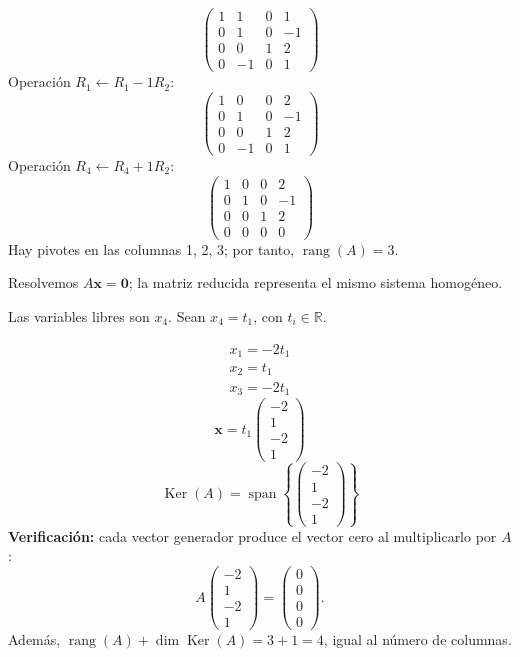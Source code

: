 \documentclass[12pt]{article}
\theoremstyle{remark}
\newcommand{\rang}{\operatorname{rang}}
\newcommand{\Ker}{\operatorname{Ker}}
\newcommand{\vect}[1]{\boldsymbol{#1}}
\begin{document}
\[
\begin{pmatrix}1&1&0&1\\0&1&0&-1\\0&0&1&2\\0&-1&0&1\end{pmatrix}
\]
Operación $R_{1}\leftarrow R_{1}-1R_{2}$:
\[
\begin{pmatrix}1&0&0&2\\0&1&0&-1\\0&0&1&2\\0&-1&0&1\end{pmatrix}
\]
Operación $R_{4}\leftarrow R_{4}+1R_{2}$:
\[
\begin{pmatrix}1&0&0&2\\0&1&0&-1\\0&0&1&2\\0&0&0&0\end{pmatrix}
\]
Hay pivotes en las columnas 1, 2, 3; por tanto, $\boxed{\rang(A)=3}$.

Resolvemos $A\vect x=\vect0$; la matriz reducida representa el mismo sistema homogéneo.

Las variables libres son $x_{4}$. Sean $x_{4}=t_{1}$, con $t_i\in\mathbb R$.

\[
\begin{aligned}x_{1}=- 2 t_{1}\\x_{2}=t_{1}\\x_{3}=- 2 t_{1}\end{aligned}
\]
\[
\vect x=t_{1}\begin{pmatrix}-2\\1\\-2\\1\end{pmatrix}
\]
\[
\boxed{\Ker(A)=\operatorname{span}\left\{\begin{pmatrix}-2\\1\\-2\\1\end{pmatrix}\right\}}
\]
\textbf{Verificación:} cada vector generador produce el vector cero al multiplicarlo por $A$:
\[
A\begin{pmatrix}-2\\1\\-2\\1\end{pmatrix}=\begin{pmatrix}0\\0\\0\\0\end{pmatrix}.
\]
Además, $\rang(A)+\dim\Ker(A)=3+1=4$, igual al número de columnas.
\end{document}
